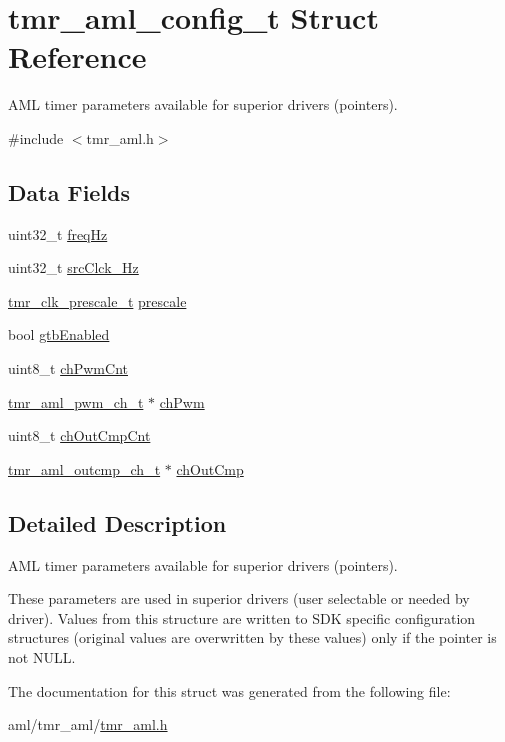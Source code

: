 \hypertarget{structtmr__aml__config__t}{}\section{tmr\+\_\+aml\+\_\+config\+\_\+t Struct Reference}
\label{structtmr__aml__config__t}


A\+ML timer parameters available for superior drivers (pointers).  




{\ttfamily \#include $<$tmr\+\_\+aml.\+h$>$}

\subsection*{Data Fields}
\begin{DoxyCompactItemize}
\item 
uint32\+\_\+t \mbox{\hyperlink{group__globals__group_gad93992caaee2a5d6d2e0d2df4313a07f}{freq\+Hz}}
\item 
uint32\+\_\+t \mbox{\hyperlink{group__globals__group_ga4386243efbc69e706d1811c2e66da6fc}{src\+Clck\+\_\+\+Hz}}
\item 
\mbox{\hyperlink{group__enum__group_ga89574487805ce2171aa6f0168a3359a0}{tmr\+\_\+clk\+\_\+prescale\+\_\+t}} \mbox{\hyperlink{group__globals__group_gad3bdd8ae4e264dd89622660e550b16fc}{prescale}}
\item 
bool \mbox{\hyperlink{group__globals__group_gadc7a8cd026c457aa793b22295fef7373}{gtb\+Enabled}}
\item 
uint8\+\_\+t \mbox{\hyperlink{group__globals__group_ga3958cb513ef18a35e622c66e94fc99ea}{ch\+Pwm\+Cnt}}
\item 
\mbox{\hyperlink{structtmr__aml__pwm__ch__t}{tmr\+\_\+aml\+\_\+pwm\+\_\+ch\+\_\+t}} $\ast$ \mbox{\hyperlink{group__globals__group_ga4adfc517ee2b4d31e619344efd325f0e}{ch\+Pwm}}
\item 
uint8\+\_\+t \mbox{\hyperlink{group__globals__group_gaf1d6b2bc4b34fa572c7d75c01b9ee9a7}{ch\+Out\+Cmp\+Cnt}}
\item 
\mbox{\hyperlink{structtmr__aml__outcmp__ch__t}{tmr\+\_\+aml\+\_\+outcmp\+\_\+ch\+\_\+t}} $\ast$ \mbox{\hyperlink{group__globals__group_ga520708f7473b24225c209d85ad776794}{ch\+Out\+Cmp}}
\end{DoxyCompactItemize}


\subsection{Detailed Description}
A\+ML timer parameters available for superior drivers (pointers). 

These parameters are used in superior drivers (user selectable or needed by driver). Values from this structure are written to S\+DK specific configuration structures (original values are overwritten by these values) only if the pointer is not N\+U\+LL. 

The documentation for this struct was generated from the following file\+:\begin{DoxyCompactItemize}
\item 
aml/tmr\+\_\+aml/\mbox{\hyperlink{tmr__aml_8h}{tmr\+\_\+aml.\+h}}\end{DoxyCompactItemize}
